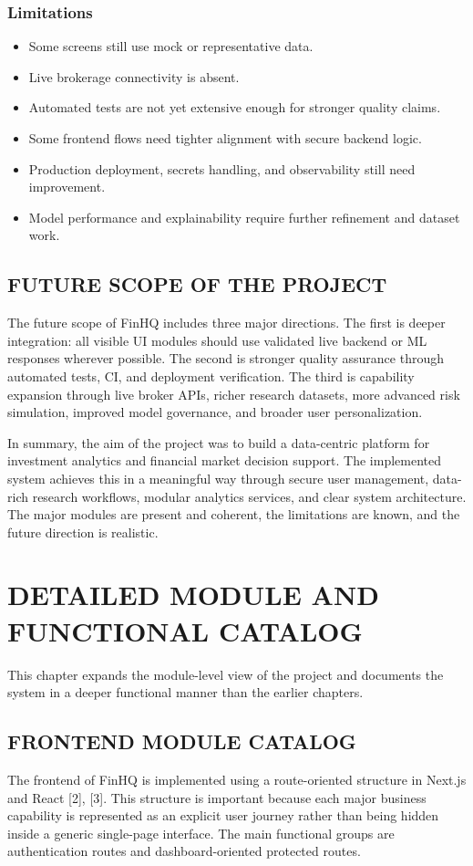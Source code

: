 \documentclass[12pt,a4paper]{report}
\newcommand{\projectshort}{FinHQ}
\begin{document}
\subsection{Limitations}
\begin{itemize}
\item Some screens still use mock or representative data.
\item Live brokerage connectivity is absent.
\item Automated tests are not yet extensive enough for stronger quality claims.
\item Some frontend flows need tighter alignment with secure backend logic.
\item Production deployment, secrets handling, and observability still need improvement.
\item Model performance and explainability require further refinement and dataset work.
\end{itemize}

\section{FUTURE SCOPE OF THE PROJECT}
The future scope of \projectshort{} includes three major directions. The first is deeper integration: all visible UI modules should use validated live backend or ML responses wherever possible. The second is stronger quality assurance through automated tests, CI, and deployment verification. The third is capability expansion through live broker APIs, richer research datasets, more advanced risk simulation, improved model governance, and broader user personalization.

In summary, the aim of the project was to build a data-centric platform for investment analytics and financial market decision support. The implemented system achieves this in a meaningful way through secure user management, data-rich research workflows, modular analytics services, and clear system architecture. The major modules are present and coherent, the limitations are known, and the future direction is realistic.

\chapter{DETAILED MODULE AND FUNCTIONAL CATALOG}
This chapter expands the module-level view of the project and documents the system in a deeper functional manner than the earlier chapters.

\section{FRONTEND MODULE CATALOG}
The frontend of \projectshort{} is implemented using a route-oriented structure in Next.js and React [2], [3]. This structure is important because each major business capability is represented as an explicit user journey rather than being hidden inside a generic single-page interface. The main functional groups are authentication routes and dashboard-oriented protected routes.
\end{document}
